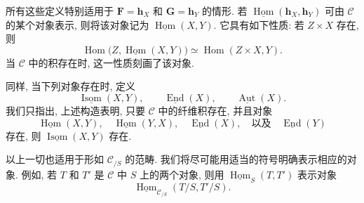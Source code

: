 所有这些定义特别适用于
\(\mathbf F=\mathbf h_X\) 和 \(\mathbf G=\mathbf h_Y\) 的情形.
若 \(\underline{\operatorname{Hom}}(\mathbf h_X,\mathbf h_Y)\)
可由 \(\mathscr C\) 的某个对象表示, 则将该对象记为
\(\underline{\operatorname{Hom}}(X,Y)\). 它具有如下性质:
若 \(Z\times X\) 存在, 则
\[
  \operatorname{Hom}
    \bigl(Z,\underline{\operatorname{Hom}}(X,Y)\bigr)
    \simeq
  \operatorname{Hom}(Z\times X,Y).
\]
当 \(\mathscr C\) 中的积存在时, 这一性质刻画了该对象.

同样, 当下列对象存在时, 定义
\[
  \underline{\operatorname{Isom}}(X,Y),
  \qquad
  \underline{\operatorname{End}}(X),
  \qquad
  \underline{\operatorname{Aut}}(X).
\]
我们只指出, 上述构造表明, 只要 \(\mathscr C\) 中的纤维积存在,
并且对象
\[
  \underline{\operatorname{Hom}}(X,Y),
  \quad
  \underline{\operatorname{Hom}}(Y,X),
  \quad
  \underline{\operatorname{End}}(X),
  \quad\text{以及}\quad
  \underline{\operatorname{End}}(Y)
\]
存在, 则 \(\underline{\operatorname{Isom}}(X,Y)\) 存在.

以上一切也适用于形如 \(\mathscr C_{/S}\) 的范畴.
我们将尽可能用适当的符号明确表示相应的对象. 例如, 若 \(T\) 和
\(T'\) 是 \(\mathscr C\) 中 \(S\) 上的两个对象, 则用
\(\underline{\operatorname{Hom}}_S(T,T')\) 表示对象
\[
  \underline{\operatorname{Hom}}_{\mathscr C_{/S}}(T/S,T'/S).
\]



